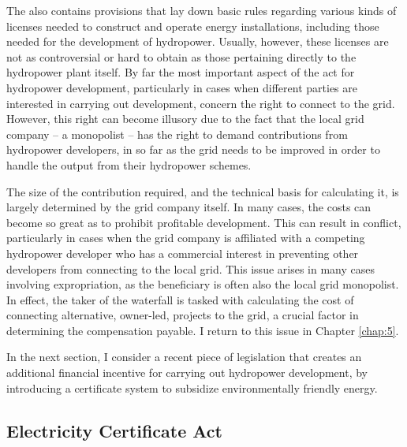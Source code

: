 The \cite{ea90} also contains provisions that lay down basic rules regarding various kinds of licenses needed to construct and operate energy installations, including those needed for the development of hydropower. Usually, however, these licenses are not as controversial or hard to obtain as those pertaining directly to the hydropower plant itself. By far the most important aspect of the act for hydropower development, particularly in cases when different parties are interested in carrying out development, concern the right to connect to the grid. However, this right can become illusory due to the fact that the local grid company -- a monopolist -- has the right to demand contributions from hydropower developers, in so far as the grid needs to be improved in order to handle the output from their hydropower schemes. 

The size of the contribution required, and the technical basis for calculating it, is largely determined by the grid company itself. In many cases, the costs can become so great as to prohibit  profitable development. This can result in conflict, particularly in cases when the grid company is affiliated with a competing hydropower developer who has a commercial interest in preventing other developers from connecting to the local grid. This issue arises in many cases involving expropriation, as the beneficiary is often also the local grid monopolist. In effect, the taker of the waterfall is tasked with calculating the cost of connecting alternative, owner-led, projects to the grid, a crucial factor in determining the  compensation payable. I return to this issue in Chapter \ref{chap:5}. 

In the next section, I consider a recent piece of legislation that creates an additional financial incentive for carrying out hydropower development, by introducing a certificate system to subsidize 
environmentally friendly energy.


\subsection{Electricity Certificate Act}\label{eca11}

